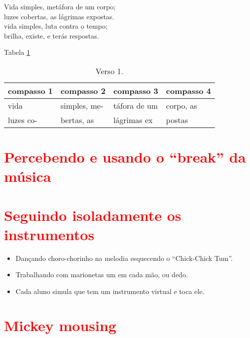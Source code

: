 \begin{citando}
Vida simples, metáfora de um corpo;\\
luzes cobertas, as lágrimas expostas.\\
vida simples, luta contra o tempo;\\
brilha, existe, e terás respostas.\\
\end{citando}


Tabela \ref{tab:verso1}

\begin{table}[h!]
\begin{center}
\begin{tabular}{|l||l||l||l|} %
\hline
compasso 1 & compasso 2   & compasso 3   & compasso 4 \\ \hline \hline
vida       & simples, me- & táfora de um & corpo,  as \\ \hline
luzes  co- & bertas, as   & lágrimas  ex & postas     \\ \hline
\end{tabular}
\caption{Verso 1.}
\label{tab:verso1}
\end{center}
\end{table}


\section{\textcolor{red}{Percebendo e usando o ``break'' da música}}




\section{\textcolor{red}{Seguindo isoladamente os instrumentos}}
\begin{itemize}
\item Dançando choro-chorinho na melodia esquecendo o ``Chick-Chick Tum''.
\item Trabalhando com marionetas um em cada mão, ou dedo.
\item Cada aluno simula que tem um instrumento virtual e toca ele.
\end{itemize}

\section{\textcolor{red}{Mickey mousing}}


